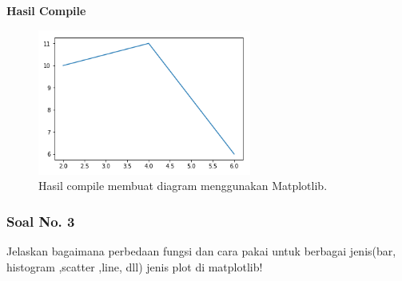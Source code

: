 

\hfill \break
\textbf{Hasil Compile}

\begin{figure}[H]
	\includegraphics[width=7cm]{figures/6/1144124/2.png}
	\centering
	\caption{Hasil compile membuat diagram menggunakan Matplotlib.}
\end{figure}

\subsubsection{Soal No. 3}
\hfill \break
Jelaskan bagaimana perbedaan fungsi dan cara pakai untuk berbagai jenis(bar, histogram ,scatter ,line, dll) jenis plot di matplotlib!

